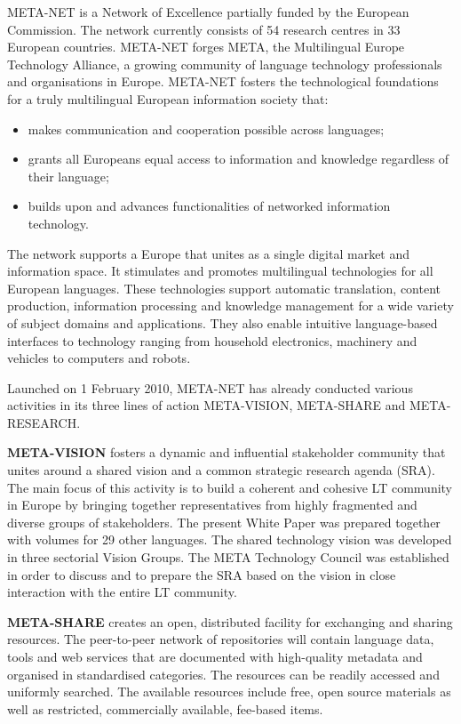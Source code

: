 \begin{multicols}{2}
META-NET is a Network of Excellence partially funded by the European Commission. 
The network currently consists of 54 research centres in 33 European countries. 
META-NET forges META, the Multilingual Europe Technology Alliance, a growing community of language technology professionals and organisations in Europe. 
META-NET fosters the technological foundations for a truly multilingual European information society that: 

\begin{itemize}
\item  makes communication and cooperation possible across languages;
\item  grants all Europeans equal access to information and knowledge regardless of their language; 
\item  builds upon and advances functionalities of networked information technology.
\end{itemize}

The network supports a Europe that unites as a single digital market and information space. 
It stimulates and promotes multilingual technologies for all European languages. 
These technologies support automatic translation, content production, information processing and knowledge management for a wide variety of subject domains and applications. 
They also enable intuitive language-based interfaces to technology ranging from household electronics, machinery and vehicles to computers and robots.

Launched on 1 February 2010, META-NET has already conducted various activities in its three lines of action META-VISION, META-SHARE and META-RESEARCH. 

\textbf{META-VISION} fosters a dynamic and inﬂuential stakeholder community that unites around a shared vision and a common strategic research agenda (SRA). 
The main focus of this activity is to build a coherent and cohesive LT community in Europe by bringing together representatives from highly fragmented and diverse groups of stakeholders. 
The present White Paper was prepared together with volumes for 29 other languages. 
The shared technology vision was developed in three sectorial Vision Groups. 
The META Technology Council was established in order to discuss and to prepare the SRA based on the vision in close interaction with the entire LT community.

\textbf{META-SHARE} creates an open, distributed facility for exchanging and sharing resources. 
The peer-to-peer network of repositories will contain language data, tools and web services that are documented with high-quality metadata and organised in standardised categories. 
The resources can be readily accessed and uniformly searched. 
The available resources include free, open source materials as well as restricted, commercially available, fee-based items.  


\end{multicols}
